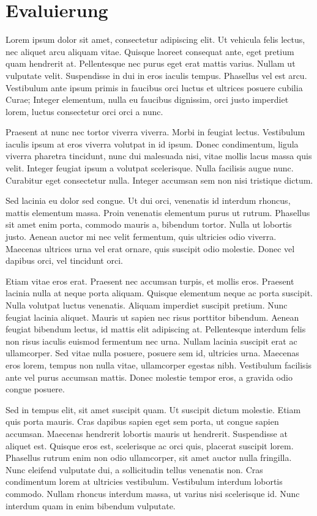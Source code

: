 \documentclass[12pt,oneside,a4paper,parskip]{scrbook}
\begin{document}
\chapter{Evaluierung}

Lorem ipsum dolor sit amet, consectetur adipiscing elit. Ut vehicula felis lectus, nec aliquet arcu aliquam vitae. Quisque laoreet consequat ante, eget pretium quam hendrerit at. Pellentesque nec purus eget erat mattis varius. Nullam ut vulputate velit. Suspendisse in dui in eros iaculis tempus. Phasellus vel est arcu. Vestibulum ante ipsum primis in faucibus orci luctus et ultrices posuere cubilia Curae; Integer elementum, nulla eu faucibus dignissim, orci justo imperdiet lorem, luctus consectetur orci orci a nunc.

Praesent at nunc nec tortor viverra viverra. Morbi in feugiat lectus. Vestibulum iaculis ipsum at eros viverra volutpat in id ipsum. Donec condimentum, ligula viverra pharetra tincidunt, nunc dui malesuada nisi, vitae mollis lacus massa quis velit. Integer feugiat ipsum a volutpat scelerisque. Nulla facilisis augue nunc. Curabitur eget consectetur nulla. Integer accumsan sem non nisi tristique dictum.

Sed lacinia eu dolor sed congue. Ut dui orci, venenatis id interdum rhoncus, mattis elementum massa. Proin venenatis elementum purus ut rutrum. Phasellus sit amet enim porta, commodo mauris a, bibendum tortor. Nulla ut lobortis justo. Aenean auctor mi nec velit fermentum, quis ultricies odio viverra. Maecenas ultrices urna vel erat ornare, quis suscipit odio molestie. Donec vel dapibus orci, vel tincidunt orci.

Etiam vitae eros erat. Praesent nec accumsan turpis, et mollis eros. Praesent lacinia nulla at neque porta aliquam. Quisque elementum neque ac porta suscipit. Nulla volutpat luctus venenatis. Aliquam imperdiet suscipit pretium. Nunc feugiat lacinia aliquet. Mauris ut sapien nec risus porttitor bibendum. Aenean feugiat bibendum lectus, id mattis elit adipiscing at. Pellentesque interdum felis non risus iaculis euismod fermentum nec urna. Nullam lacinia suscipit erat ac ullamcorper. Sed vitae nulla posuere, posuere sem id, ultricies urna. Maecenas eros lorem, tempus non nulla vitae, ullamcorper egestas nibh. Vestibulum facilisis ante vel purus accumsan mattis. Donec molestie tempor eros, a gravida odio congue posuere.

Sed in tempus elit, sit amet suscipit quam. Ut suscipit dictum molestie. Etiam quis porta mauris. Cras dapibus sapien eget sem porta, ut congue sapien accumsan. Maecenas hendrerit lobortis mauris ut hendrerit. Suspendisse at aliquet est. Quisque eros est, scelerisque ac orci quis, placerat suscipit lorem. Phasellus rutrum enim non odio ullamcorper, sit amet auctor nulla fringilla. Nunc eleifend vulputate dui, a sollicitudin tellus venenatis non. Cras condimentum lorem at ultricies vestibulum. Vestibulum interdum lobortis commodo. Nullam rhoncus interdum massa, ut varius nisi scelerisque id. Nunc interdum quam in enim bibendum vulputate.
\end{document}
